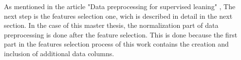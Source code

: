 \documentclass[../masterarbeit.tex]{subfiles}
\begin{document}
As mentioned in the article "Data preprocessing for supervised leaning" \textcite[]{kotsiantis2006data}, The next step is the features selection one, wich is described in detail in the next section. 
In the case of this master thesis, the normalization part of data preprocessing is done after the feature selection. This is done because the first part in the features selection process of this work contains the creation and inclusion of additional data columns.
\end{document}
